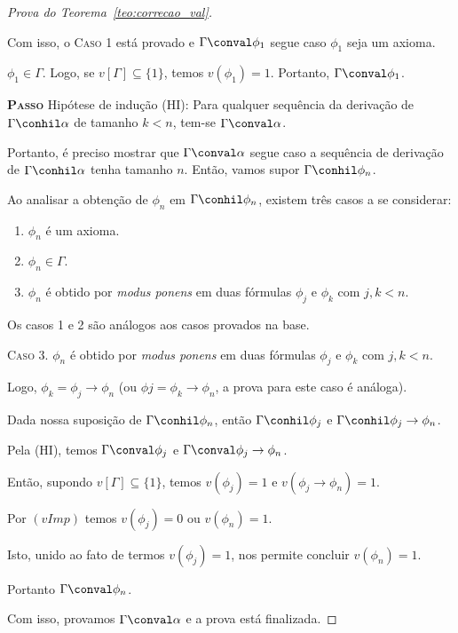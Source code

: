 \begin{proof}[Prova do Teorema~\ref{teo:correcao_val}]
\begin{provaporcasos}
                Com isso, o \textsc{Caso 1} está provado e $\Gamma \conval \phi_{1}$ segue caso $\phi_{1}$ seja um axioma.
    
                \casodeprova{} $\phi_{1} \in \Gamma$. Logo, se $v[\Gamma] \subseteq \{1\}$, temos $v(\phi_{1}) = 1$. Portanto, $\Gamma \conval \phi_{1}$.
    
            \end{provaporcasos}
    
             \noindent \textbf{\textsc{Passo}} Hipótese de indução (HI): Para qualquer sequência da derivação de $\Gamma \conhil \alpha$ de tamanho $k < n$, tem-se $\Gamma \conval \alpha$. 
             
             Portanto, é preciso mostrar que $\Gamma \conval \alpha$ segue caso a sequência de derivação de $\Gamma \conhil \alpha$ tenha tamanho $n$. Então, vamos supor $\Gamma \conhil \phi_{n}$.
             
             Ao analisar a obtenção de $\phi_{n}$ em $\Gamma \conhil \phi_{n}$, existem três casos a se considerar:
             
             \begin{enumerate}
                \item $\phi_{n}$ é um axioma.
                \item $\phi_{n} \in \Gamma$.
                \item $\phi_{n}$ é obtido por \textit{modus ponens} em duas fórmulas $\phi_{j}$ e $\phi_{k}$ com $j, k < n$. 
             \end{enumerate}
             
             Os casos 1 e 2 são análogos aos casos provados na base.
             
             \noindent \textsc{Caso 3.} $\phi_{n}$ é obtido por \textit{modus ponens} em duas fórmulas $\phi_{j}$ e $\phi_{k}$ com $j, k < n$. 
             
             Logo, $\phi_{k} = \phi_{j} \to \phi_{n}$ (ou $\phi{j} = \phi_{k} \to \phi_{n}$, a prova para este caso é análoga). 
             
             Dada nossa suposição de $\Gamma \conhil \phi_{n}$, então $\Gamma \conhil \phi_{j}$ e $\Gamma \conhil \phi_{j} \to \phi_{n}$. 
             
             Pela (HI), temos $\Gamma \conval \phi_{j}$ e $\Gamma \conval \phi_{j} \to \phi_{n}$. 
             
             Então, supondo $v[\Gamma] \subseteq \{1\}$, temos $v(\phi_{j}) = 1$ e $v(\phi_{j} \to \phi_{n}) = 1$. 
             
             Por $(vImp)$ temos $v(\phi_{j}) = 0$ ou $v(\phi_{n}) = 1$. 
             
             Isto, unido ao fato de termos $v(\phi_{j}) = 1$, nos permite concluir $v(\phi_{n}) = 1$. 
             
             Portanto $\Gamma \conval \phi_{n}$.
    
             \noindent Com isso, provamos $\Gamma \conval \alpha$ e a prova está finalizada.
    
        \end{proof}
